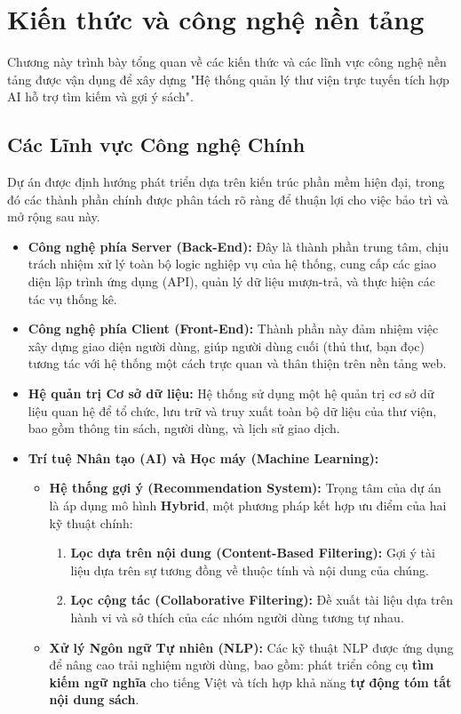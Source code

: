 \newpage
\chapter{Kiến thức và công nghệ nền tảng}

Chương này trình bày tổng quan về các kiến thức và các lĩnh vực công nghệ nền tảng được vận dụng để xây dựng "Hệ thống quản lý thư viện trực tuyến tích hợp AI hỗ trợ tìm kiếm và gợi ý sách".

\section{Các Lĩnh vực Công nghệ Chính}

Dự án được định hướng phát triển dựa trên kiến trúc phần mềm hiện đại, trong đó các thành phần chính được phân tách rõ ràng để thuận lợi cho việc bảo trì và mở rộng sau này.

\begin{itemize}
    \item \textbf{Công nghệ phía Server (Back-End):} Đây là thành phần trung tâm, chịu trách nhiệm xử lý toàn bộ logic nghiệp vụ của hệ thống, cung cấp các giao diện lập trình ứng dụng (API), quản lý dữ liệu mượn-trả, và thực hiện các tác vụ thống kê.

    \item \textbf{Công nghệ phía Client (Front-End):} Thành phần này đảm nhiệm việc xây dựng giao diện người dùng, giúp người dùng cuối (thủ thư, bạn đọc) tương tác với hệ thống một cách trực quan và thân thiện trên nền tảng web.

    \item \textbf{Hệ quản trị Cơ sở dữ liệu:} Hệ thống sử dụng một hệ quản trị cơ sở dữ liệu quan hệ để tổ chức, lưu trữ và truy xuất toàn bộ dữ liệu của thư viện, bao gồm thông tin sách, người dùng, và lịch sử giao dịch.

    \item \textbf{Trí tuệ Nhân tạo (AI) và Học máy (Machine Learning):}
    \begin{itemize}
        \item \textbf{Hệ thống gợi ý (Recommendation System):} Trọng tâm của dự án là áp dụng mô hình \textbf{Hybrid}, một phương pháp kết hợp ưu điểm của hai kỹ thuật chính:
        \begin{enumerate}
            \item \textbf{Lọc dựa trên nội dung (Content-Based Filtering):} Gợi ý tài liệu dựa trên sự tương đồng về thuộc tính và nội dung của chúng.
            \item \textbf{Lọc cộng tác (Collaborative Filtering):} Đề xuất tài liệu dựa trên hành vi và sở thích của các nhóm người dùng tương tự nhau.
        \end{enumerate}

        \item \textbf{Xử lý Ngôn ngữ Tự nhiên (NLP):} Các kỹ thuật NLP được ứng dụng để nâng cao trải nghiệm người dùng, bao gồm: phát triển công cụ \textbf{tìm kiếm ngữ nghĩa} cho tiếng Việt và tích hợp khả năng \textbf{tự động tóm tắt nội dung sách}.
    \end{itemize}
\end{itemize}

